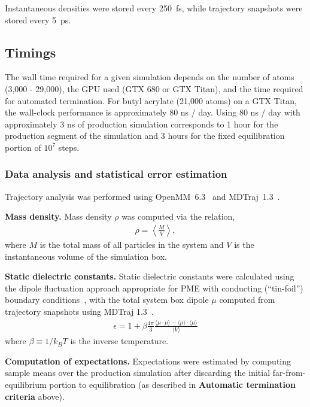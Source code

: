 \documentclass[aip, jcp, reprint]{revtex4-1}  %
\begin{document}
Instantaneous densities were stored every 250~fs, while trajectory snapshots were stored every 5~ps.  

\subsection{Timings}

The wall time required for a given simulation depends on the number of atoms (3,000 - 29,000), the GPU used (GTX 680 or GTX Titan), and the time required for automated termination.  For butyl acrylate (21,000 atoms) on a GTX Titan, the wall-clock performance is approximately 80 ns / day.  Using 80 ns / day with approximately 3 ns of production simulation corresponds to 1 hour for the production segment of the simulation and 3 hours for the fixed equilibration portion of $10^7$ steps.  

\subsubsection{Data analysis and statistical error estimation}

Trajectory analysis was performed using OpenMM~6.3~\cite{eastman2012openmm} and MDTraj~1.3~\cite{mcgibbon2014mdtraj}.  

{\bf Mass density.}
Mass density $\rho$ was computed via the relation,
\begin{eqnarray}
\rho = \left\langle \frac{M}{V} \right\rangle \label{equation:mass-density} ,
 \end{eqnarray}
where $M$ is the total mass of all particles in the system and $V$ is the instantaneous volume of the simulation box.

{\bf Static dielectric constants.}
Static dielectric constants were calculated using the dipole fluctuation approach appropriate for PME with conducting (``tin-foil'') boundary conditions~\cite{horn2004, neumann1983dipole}, with the total system box dipole $\mu$ computed from trajectory snapshots using MDTraj 1.3~\cite{mcgibbon2014mdtraj}.
\begin{eqnarray}
\epsilon = 1 + \beta \frac{4\pi}{3} \frac{\langle \mu \cdot \mu \rangle - \langle \mu \rangle \cdot \langle \mu \rangle}{\langle V \rangle} \label{equation:dielectric_calculation}
\end{eqnarray}
where $\beta \equiv 1 / k_B T$ is the inverse temperature.

{\bf Computation of expectations.}
Expectations were estimated by computing sample means over the production simulation after discarding the initial far-from-equilibrium portion to equilibration (as described in {\bf Automatic termination criteria} above).
\end{document}
